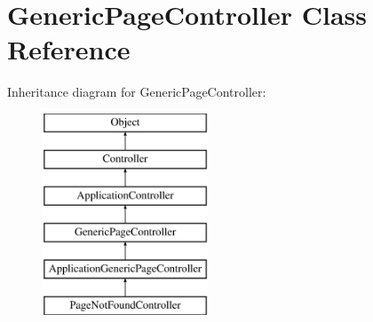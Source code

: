 \hypertarget{class_generic_page_controller}{
\section{GenericPageController Class Reference}
\label{class_generic_page_controller}
}
Inheritance diagram for GenericPageController:\begin{figure}[H]
\begin{center}
\leavevmode
\includegraphics[height=6.000000cm]{class_generic_page_controller}
\end{center}
\end{figure}

